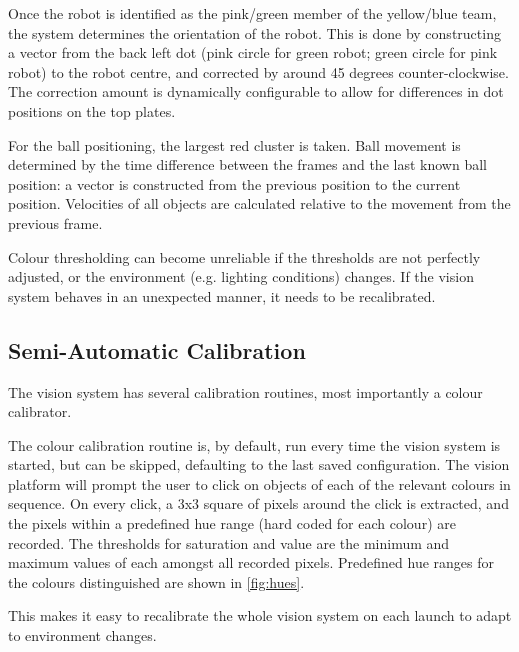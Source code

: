 Once the robot is identified as the pink/green member of the yellow/blue team, the system determines the orientation of the robot. This is done by constructing a vector from the back left dot (pink circle for green robot; green circle for pink robot) to the robot centre, and corrected by around 45 degrees counter-clockwise. The correction amount is dynamically configurable to allow for differences in dot positions on the top plates.

For the ball positioning, the largest red cluster is taken. Ball movement is determined by the time difference between the frames and the last known ball position: a vector is constructed from the previous position to the current position. Velocities of all objects are calculated relative to the movement from the previous frame. 

Colour thresholding can become unreliable if the thresholds are not perfectly adjusted, or the environment (e.g. lighting conditions) changes. If the vision system behaves in an unexpected manner, it needs to be recalibrated.


\subsection{Semi-Automatic Calibration}

The vision system has several calibration routines, most importantly a colour calibrator. 

The colour calibration routine is, by default, run every time the vision system is started, but can be skipped, defaulting to the last saved configuration. 
The vision platform will prompt the user to click on objects of each of the relevant colours in sequence. On every click, a 3x3 square of pixels around the click is extracted, and the pixels within a predefined hue range (hard coded for each colour) are recorded. 
The thresholds for saturation and value are the minimum and maximum values of each amongst all recorded pixels. Predefined hue ranges for the colours distinguished are shown in \autoref{fig:hues}.

This makes it easy to recalibrate the whole vision system on each launch to adapt to environment changes.

